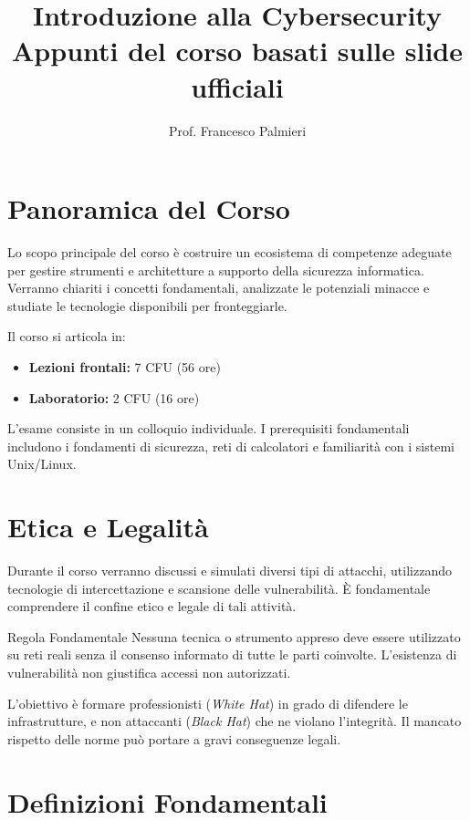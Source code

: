 \documentclass[a4paper,12pt]{article}
\title{\textbf{Introduzione alla Cybersecurity}\\
\large Appunti del corso basati sulle slide ufficiali}
\author{Prof. Francesco Palmieri}
\date{}
\begin{document}
\maketitle
\tableofcontents
\newpage

\section{Panoramica del Corso}

Lo scopo principale del corso è costruire un ecosistema di competenze adeguate per gestire strumenti e architetture a supporto della sicurezza informatica. Verranno chiariti i concetti fondamentali, analizzate le potenziali minacce e studiate le tecnologie disponibili per fronteggiarle.

Il corso si articola in:
\begin{itemize}
    \item \textbf{Lezioni frontali:} 7 CFU (56 ore)
    \item \textbf{Laboratorio:} 2 CFU (16 ore)
\end{itemize}

L'esame consiste in un colloquio individuale. I prerequisiti fondamentali includono i fondamenti di sicurezza, reti di calcolatori e familiarità con i sistemi Unix/Linux.

\section{Etica e Legalità}

Durante il corso verranno discussi e simulati diversi tipi di attacchi, utilizzando tecnologie di intercettazione e scansione delle vulnerabilità. È fondamentale comprendere il confine etico e legale di tali attività.

\begin{definizione}{Regola Fondamentale}
Nessuna tecnica o strumento appreso deve essere utilizzato su reti reali senza il consenso informato di tutte le parti coinvolte. L'esistenza di vulnerabilità non giustifica accessi non autorizzati.
\end{definizione}

L'obiettivo è formare professionisti (\textit{White Hat}) in grado di difendere le infrastrutture, e non attaccanti (\textit{Black Hat}) che ne violano l'integrità. Il mancato rispetto delle norme può portare a gravi conseguenze legali.

\section{Definizioni Fondamentali}
\end{document}
